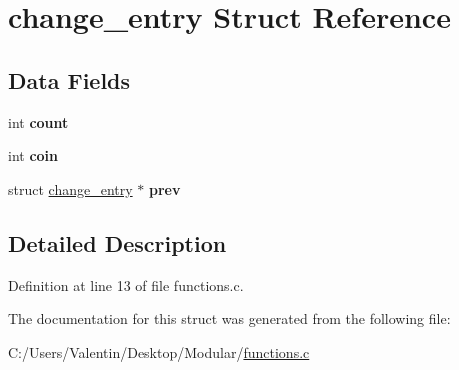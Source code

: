 \hypertarget{structchange__entry}{}\section{change\+\_\+entry Struct Reference}
\label{structchange__entry}
\subsection*{Data Fields}
\begin{DoxyCompactItemize}
\item 
\mbox{\label{structchange__entry_ad43c3812e6d13e0518d9f8b8f463ffcf}} 
int {\bfseries count}
\item 
\mbox{\label{structchange__entry_a41de228368d6181324d7bfbdf40875e3}} 
int {\bfseries coin}
\item 
\mbox{\label{structchange__entry_ac16d423c9d5373f237ca4a9782779bae}} 
struct \mbox{\hyperlink{structchange__entry}{change\+\_\+entry}} $\ast$ {\bfseries prev}
\end{DoxyCompactItemize}


\subsection{Detailed Description}


Definition at line 13 of file functions.\+c.



The documentation for this struct was generated from the following file\+:\begin{DoxyCompactItemize}
\item 
C\+:/\+Users/\+Valentin/\+Desktop/\+Modular/\mbox{\hyperlink{functions_8c}{functions.\+c}}\end{DoxyCompactItemize}
